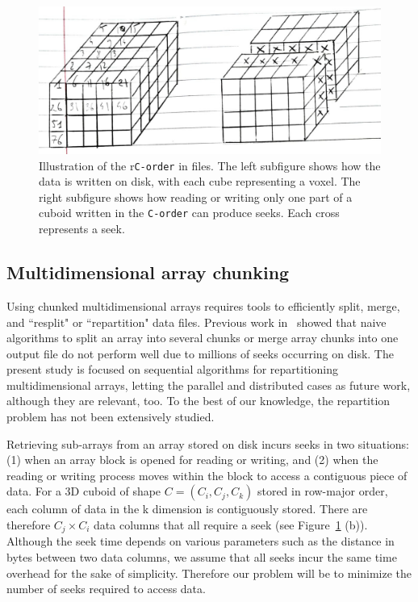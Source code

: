 \documentclass[sigconf, nonacm]{acmart}
\begin{document}
\begin{figure}[h]
  \centering
  \includegraphics[scale=0.35]{./figures/new/seeks_and_rowmajor.jpeg}
  \caption{Illustration of the r\texttt{C-order} in files. The left subfigure
  shows how the data is written on disk, with each cube representing a voxel. The
  right subfigure shows how reading or writing only one part of a cuboid written
  in the \texttt{C-order} can produce seeks. Each cross represents a seek.}
  \label{fig:seeks_and_rowmajor}
\end{figure}



\subsection{Multidimensional array chunking}

Using chunked multidimensional arrays requires tools to efficiently split,
merge, and ``resplit" or ``repartition" data files. Previous work in~\cite{seqalgorithms}
showed that naive algorithms to split an array into several chunks or merge
array chunks into one output file do not perform well due to millions of seeks
occurring on disk. The present study is focused on sequential algorithms for
repartitioning multidimensional arrays, letting the parallel and distributed
cases as future work, although they are relevant, too. To the best of our
knowledge, the repartition problem has not been extensively studied.

Retrieving sub-arrays from an array stored on disk incurs seeks in two
situations: (1) when an array block is opened for reading or writing, and (2)
when the reading or writing process moves within the block to access a
contiguous piece of data. For a 3D cuboid of shape $C = (C_i, C_j, C_k)$ stored
in row-major order, each column of data in the k dimension is contiguously
stored. There are therefore $C_j \times C_i$ data columns that all require a
seek (see Figure~\ref{fig:seeks_and_rowmajor} (b)).
Although the seek time depends on various parameters such as the distance
in bytes between two data columns, we assume that all seeks incur the same time
overhead for the sake of simplicity. Therefore our problem will be to minimize
the number of seeks required to access data.
\end{document}
